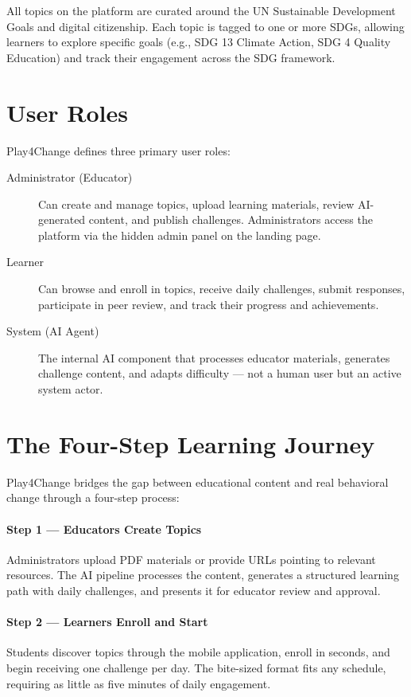 All topics on the platform are curated around the UN Sustainable Development Goals and digital citizenship. Each topic is tagged to one or more SDGs, allowing learners to explore specific goals (e.g., SDG 13 Climate Action, SDG 4 Quality Education) and track their engagement across the SDG framework.

\section{User Roles}
\label{sec:roles}

Play4Change defines three primary user roles:

\begin{description}
    \item[Administrator (Educator)] Can create and manage topics, upload learning materials, review AI-generated content, and publish challenges. Administrators access the platform via the hidden admin panel on the landing page.
    \item[Learner] Can browse and enroll in topics, receive daily challenges, submit responses, participate in peer review, and track their progress and achievements.
    \item[System (AI Agent)] The internal AI component that processes educator materials, generates challenge content, and adapts difficulty — not a human user but an active system actor.
\end{description}

\section{The Four-Step Learning Journey}
\label{sec:journey}

Play4Change bridges the gap between educational content and real behavioral change through a four-step process:

\paragraph{Step 1 — Educators Create Topics}
Administrators upload PDF materials or provide URLs pointing to relevant resources. The AI pipeline processes the content, generates a structured learning path with daily challenges, and presents it for educator review and approval.

\paragraph{Step 2 — Learners Enroll and Start}
Students discover topics through the mobile application, enroll in seconds, and begin receiving one challenge per day. The bite-sized format fits any schedule, requiring as little as five minutes of daily engagement.

